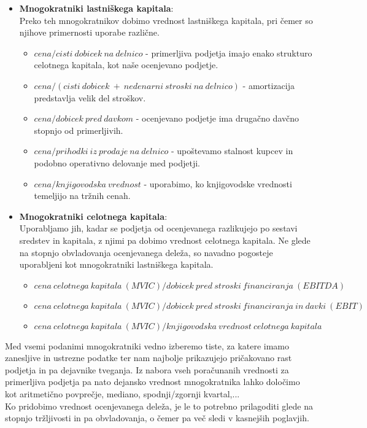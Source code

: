 \documentclass[12pt,a4paper]{amsart}
\theoremstyle{definition} %
\theoremstyle{plain} %
\begin{document}
\begin{itemize}
\item \textbf{Mnogokratniki lastniškega kapitala}:\\
Preko teh mnogokratnikov dobimo vrednost lastniškega kapitala, pri čemer so njihove primernosti uporabe različne. 
\begin{itemize}
\item $cena/cisti\ dobicek\ na\ delnico$ - primerljiva podjetja imajo enako strukturo celotnega kapitala, kot naše ocenjevano podjetje.
\item $cena/(cisti\ dobicek\ +\ nedenarni\ stroski\ na\ delnico)$ - amortizacija predstavlja velik del stroškov.
\item $cena/dobicek\ pred\ davkom$ - ocenjevano podjetje ima drugačno davčno stopnjo od primerljivih.
\item $cena/prihodki\ iz\ prodaje\ na\ delnico$ - upoštevamo stalnost kupcev in podobno operativno delovanje med podjetji.
\item $cena/knjigovodska\ vrednost$ - uporabimo, ko knjigovodske vrednosti temeljijo na tržnih cenah.\newline
\end{itemize}\par
\item \textbf{Mnogokratniki celotnega kapitala}:\\
Uporabljamo jih, kadar se podjetja od ocenjevanega razlikujejo po sestavi sredstev in kapitala, z njimi pa dobimo vrednost celotnega kapitala. Ne glede na stopnjo obvladovanja ocenjevanega deleža, so navadno pogosteje uporabljeni kot mnogokratniki lastniškega kapitala.
\begin{itemize}
\item $cena\ celotnega\ kapitala\ (MVIC)/dobicek\ pred\ stroski\ financiranja\ (EBITDA)$
\item $cena\ celotnega\ kapitala\ (MVIC)/dobicek\ pred\ stroski\ financiranja\ in\ davki\ (EBIT)$
\item $cena\ celotnega\ kapitala\ (MVIC)/knjigovodska\ vrednost\ celotnega\ kapitala$ \newline
\end{itemize}
\end{itemize}

Med vsemi podanimi mnogokratniki vedno izberemo tiste, za katere imamo zanesljive in ustrezne podatke ter nam najbolje prikazujejo pričakovano rast podjetja in pa dejavnike tveganja. Iz nabora vseh poračunanih vrednosti za primerljiva podjetja pa nato dejansko vrednost mnogokratnika lahko določimo kot aritmetično povprečje, mediano, spodnji/zgornji kvartal,... \\
Ko pridobimo vrednost ocenjevanega deleža, je le to potrebno prilagoditi glede na stopnjo tržljivosti in pa obvladovanja, o čemer pa več sledi v kasnejših poglavjih.
\end{document}
